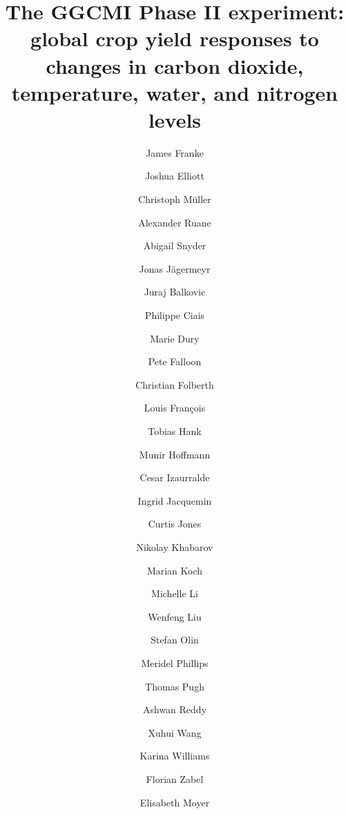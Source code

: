 \documentclass[preprint, 5p, times, twocolumn]{elsarticle}
\begin{document}
\begin{frontmatter}
\title{The GGCMI Phase II experiment: global crop yield responses to changes
in carbon dioxide, temperature, water, and nitrogen levels}

\author[1,2]{James Franke}
\author[2,3]{Joshua Elliott}
\author[4]{Christoph M\"{u}ller}
\author[5]{Alexander Ruane}
\author[6]{Abigail Snyder}
\author[3,2,4,5]{Jonas J\"{a}germeyr}
\author[7,8]{Juraj Balkovic}
\author[9,10]{Philippe Ciais}
\author[11]{Marie Dury}
\author[12]{Pete Falloon}
\author[7]{Christian Folberth}
\author[11]{Louis Fran{\c{c}}ois}
\author[13]{Tobias Hank}
\author[14]{Munir Hoffmann}
\author[15,16]{Cesar Izaurralde}
\author[11]{Ingrid Jacquemin}
\author[15]{Curtis Jones}
\author[7]{Nikolay Khabarov}
\author[14]{Marian Koch}
\author[2, 17]{Michelle Li}
\author[18,9]{Wenfeng Liu}
\author[19]{Stefan Olin}
\author[5,20]{Meridel Phillips}
\author[21,22]{Thomas Pugh}
\author[15]{Ashwan Reddy}
\author[9,10]{Xuhui Wang}
\author[12]{Karina Williams}
\author[13]{Florian Zabel}
\author[1,2]{Elisabeth Moyer}


\end{frontmatter}
\end{document}
